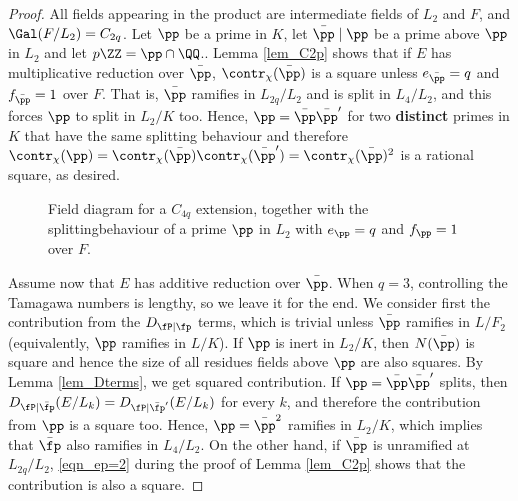 \begin{proof}
    All fields appearing in the product are intermediate fields of $L_2$ and $F$, and $\Gal(F/L_2)=C_{2q}$. Let $\pp$ be a prime in $K$, let $\bar\pp\mid\pp$ be a prime above $\pp$ in $L_2$ and let $p\ZZ=\pp\cap\QQ$.. Lemma \ref{lem_C2p} shows that if $E$ has multiplicative reduction over $\bar\pp$, $\contr_\chi(\bar\pp)$ is a square unless $e_{\bar\pp}=q$ and $f_{\bar\pp}=1$ over $F$. That is, $\bar\pp$ ramifies in $L_{2q}/L_2$ and is split in $L_4/L_2$, and this forces $\pp$ to split in $L_2/K$ too. Hence, $\pp=\bar\pp\bar\pp'$ for two \textbf{distinct} primes in $K$ that have the same splitting behaviour and therefore $\contr_\chi(\pp)=\contr_\chi(\bar\pp)\contr_\chi(\bar\pp')=\contr_\chi(\bar\pp)^2$ is a rational square, as desired.

    \begin{figure}[!ht]
        \centering
        \caption[short]{\centering Field diagram for a $C_{4q}$ extension, together with the splitting\newline behaviour of a prime $\pp$ in $L_2$ with $e_\pp=q$ and $f_\pp=1$ over $F$.}
    \end{figure}

    Assume now that $E$ has additive reduction over $\bar\pp$. When $q=3$, controlling the Tamagawa numbers is lengthy, so we leave it for the end. We consider first the contribution from the $D_{\fP\mid\fp}$ terms, which is trivial unless $\bar\pp$ ramifies in $L/F_2$ (equivalently, $\pp$ ramifies in $L/K$). If $\pp$ is inert in $L_2/K$, then $N(\bar{\pp})$ is square and hence the size of all residues fields above $\pp$ are also squares. By Lemma \ref{lem_Dterms}, we get squared contribution. If $\pp=\bar\pp\bar\pp'$ splits, then $D_{\fP\mid\bar\fp}(E/L_k)=D_{\fP\mid\bar\fp'}(E/L_k)$ for every $k$, and therefore the contribution from $\pp$ is a square too. Hence, $\pp=\bar\pp^2$ ramifies in $L_2/K$, which implies that $\bar\fp$ also ramifies in $L_4/L_2$. On the other hand, if $\bar\pp$ is unramified at $L_{2q}/L_2$, \eqref{eqn_ep=2} during the proof of Lemma \ref{lem_C2p} shows that the contribution is also a square. 


\end{proof}
